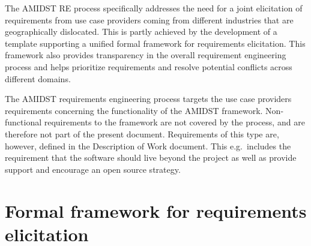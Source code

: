 \documentclass[11pt, oneside]{article}   	%
\begin{document}
The AMIDST RE process specifically addresses the need for a joint elicitation of requirements from use case providers coming from
different industries that are geographically dislocated. This is partly achieved by the development of a template
supporting a 
unified formal framework for requirements elicitation. This framework also provides transparency in the overall
requirement engineering process and helps prioritize requirements and resolve potential conflicts across different domains.  

The AMIDST requirements engineering process targets the use case providers requirements concerning
the functionality of the AMIDST framework. Non-functional requirements to the framework are not covered by the process,
and are therefore not part of the present document. Requirements of this type are, however, defined in the Description
of Work document. This e.g.\ includes the requirement that the software should live beyond the project as well as
provide support and
encourage an open source strategy. 



\newpage














\appendix


\section{Formal framework for requirements elicitation}
\label{sec:form-fram-requ}


\end{document}
